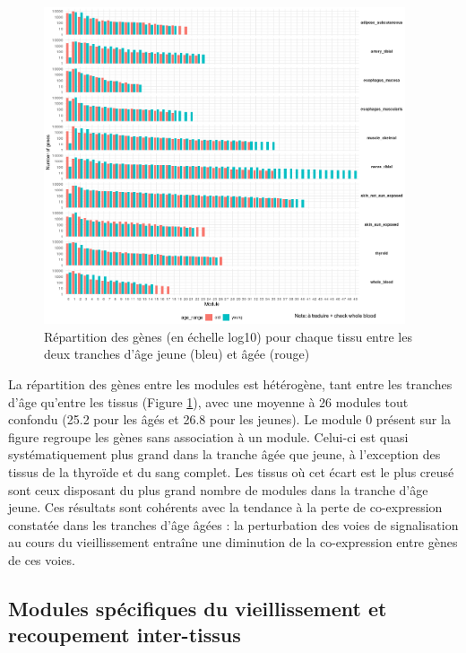 \begin{figure}[!hb]
    \centering
    \includegraphics[width=0.95\textwidth]{img/chap2/chap2_repartition_genes_modules_tissus.png}
    \caption{Répartition des gènes (en échelle log10) pour chaque tissu entre les deux tranches d'âge jeune (bleu) et âgée (rouge)}
    \label{figure:repartition_genes_modules_tissus}
\end{figure}

La répartition des gènes entre les modules est hétérogène, tant entre les tranches d'âge qu'entre les tissus (Figure \ref{figure:repartition_genes_modules_tissus}), avec une moyenne à 26 modules tout confondu (25.2 pour les âgés et 26.8 pour les jeunes). Le module 0 présent sur la figure regroupe les gènes sans association à un module. Celui-ci est quasi systématiquement plus grand dans la tranche âgée que jeune, à l'exception des tissus de la thyroïde et du sang complet. Les tissus où cet écart est le plus creusé sont ceux disposant du plus grand nombre de modules dans la tranche d'âge jeune. Ces résultats sont cohérents avec la tendance à la perte de co-expression constatée dans les tranches d'âge âgées  : la perturbation des voies de signalisation au cours du vieillissement entraîne une diminution de la co-expression entre gènes de ces voies.


\subsection{Modules spécifiques du vieillissement et recoupement inter-tissus}

